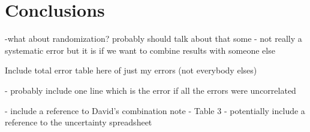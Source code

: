 
\section{Conclusions}

-what about randomization? probably should talk about that some - not really a systematic error but it is if we want to combine results with someone else


Include total error table here of just my errors (not everybody elses)

- probably include one line which is the error if all the errors were uncorrelated

- include a reference to David's combination note \cite{CombinationNote} - Table 3 
- potentially include a reference to the uncertainty spreadsheet \cite{UncertaintySpreadsheet}
